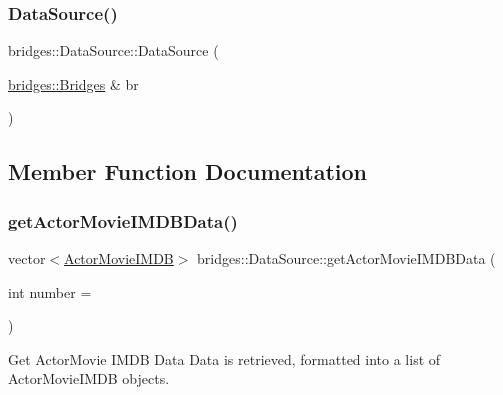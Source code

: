 \mbox{\label{classbridges_1_1_data_source_a0da0dc59d798aa3266df7931a396a4c9}} 
\subsubsection{\texorpdfstring{Data\+Source()}{DataSource()}\hspace{0.1cm}{\footnotesize\ttfamily [2/2]}}
{\footnotesize\ttfamily bridges\+::\+Data\+Source\+::\+Data\+Source (\begin{DoxyParamCaption}\item[{\hyperlink{classbridges_1_1_bridges}{bridges\+::\+Bridges} \&}]{br }\end{DoxyParamCaption})\hspace{0.3cm}{\ttfamily [inline]}}



\subsection{Member Function Documentation}
\mbox{\label{classbridges_1_1_data_source_a664694136550312ab3f5a82bebb91bca}} 
\subsubsection{\texorpdfstring{get\+Actor\+Movie\+I\+M\+D\+B\+Data()}{getActorMovieIMDBData()}}
{\footnotesize\ttfamily vector$<$\hyperlink{classbridges_1_1dataset_1_1_actor_movie_i_m_d_b}{Actor\+Movie\+I\+M\+DB}$>$ bridges\+::\+Data\+Source\+::get\+Actor\+Movie\+I\+M\+D\+B\+Data (\begin{DoxyParamCaption}\item[{int}]{number = {} }\end{DoxyParamCaption})\hspace{0.3cm}{\ttfamily [inline]}}



Get Actor\+Movie I\+M\+DB Data Data is retrieved, formatted into a list of Actor\+Movie\+I\+M\+DB objects. 


